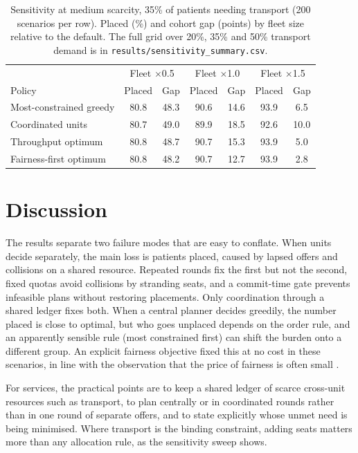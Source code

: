\documentclass[11pt,a4paper]{article}
\newcommand{\code}[1]{\texttt{#1}}
\begin{document}
\begin{table}[t]
\centering
\caption{Sensitivity at medium scarcity, 35\% of patients needing transport (200 scenarios per row). Placed (\%)
and cohort gap (points) by fleet size relative to the default. The full grid over 20\%, 35\% and 50\% transport
demand is in \code{results/sensitivity\_summary.csv}.}
\label{tab:sweep}
\small
\begin{tabular}{lcccccc}
\toprule
 & \multicolumn{2}{c}{Fleet $\times$0.5} & \multicolumn{2}{c}{Fleet $\times$1.0} & \multicolumn{2}{c}{Fleet $\times$1.5} \\
Policy & Placed & Gap & Placed & Gap & Placed & Gap \\
\midrule
Most-constrained greedy & 80.8 & 48.3 & 90.6 & 14.6 & 93.9 & 6.5 \\
Coordinated units & 80.7 & 49.0 & 89.9 & 18.5 & 92.6 & 10.0 \\
Throughput optimum & 80.8 & 48.7 & 90.7 & 15.3 & 93.9 & 5.0 \\
Fairness-first optimum & 80.8 & 48.2 & 90.7 & 12.7 & 93.9 & 2.8 \\
\bottomrule
\end{tabular}
\end{table}

\section{Discussion}
The results separate two failure modes that are easy to conflate. When units decide separately, the main loss
is patients placed, caused by lapsed offers and collisions on a shared resource. Repeated rounds fix the first
but not the second, fixed quotas avoid collisions by stranding seats, and a commit-time gate prevents infeasible
plans without restoring placements. Only coordination through a shared ledger fixes both. When a central
planner decides greedily, the number placed is close to optimal, but who goes unplaced depends on the order
rule, and an apparently sensible rule (most constrained first) can shift the burden onto a different group.
An explicit fairness objective fixed this at no cost in these scenarios, in line with the observation that
the price of fairness is often small \citep{bertsimas2011price}.

For services, the practical points are to keep a shared ledger of scarce cross-unit resources such as
transport, to plan centrally or in coordinated rounds rather than in one round of separate offers, and to
state explicitly whose unmet need is being minimised. Where transport is the binding constraint, adding seats
matters more than any allocation rule, as the sensitivity sweep shows.
\end{document}
